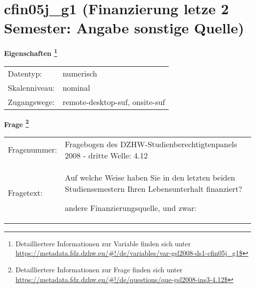 
    \setcounter{footnote}{0}

    \vspace*{-1.8cm}
	\section{cfin05j\_g1 (Finanzierung letze 2 Semester: Angabe sonstige Quelle)}
	\label{section:cfin05j_g1}



    \vspace*{0.5cm}
    \noindent\textbf{Eigenschaften
	\footnote{Detailliertere Informationen zur Variable finden sich unter
		\url{https://metadata.fdz.dzhw.eu/\#!/de/variables/var-gsl2008-ds1-cfin05j_g1$}}}\\
	\begin{tabularx}{\hsize}{@{}lX}
	Datentyp: & numerisch \\
	Skalenniveau: & nominal \\
	Zugangswege: &
	  remote-desktop-suf, 
	  onsite-suf
 \\
    \end{tabularx}



				\vspace*{0.5cm}
                \noindent\textbf{Frage
	                \footnote{Detailliertere Informationen zur Frage finden sich unter
		              \url{https://metadata.fdz.dzhw.eu/\#!/de/questions/que-gsl2008-ins3-4.12$}}}\\
				\begin{tabularx}{\hsize}{@{}lX}
					Fragenummer: &
					  Fragebogen des DZHW-Studienberechtigtenpanels 2008 - dritte Welle:
					  4.12
 \\
					Fragetext: & Auf welche Weise haben Sie in den letzten beiden Studiensemestern Ihren Lebensunterhalt finanziert?\par  andere Finanzierungsquelle, und zwar: \\
				\end{tabularx}





